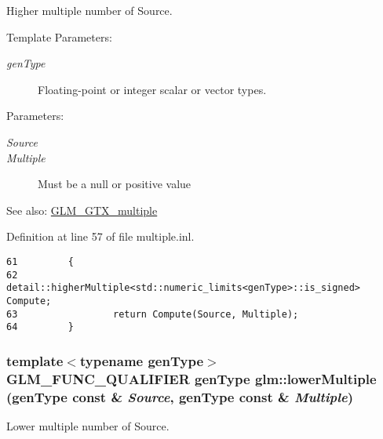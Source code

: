 Higher multiple number of Source.

\begin{Desc}
\item[Template Parameters:]
\begin{description}
\item[{\em genType}]Floating-point or integer scalar or vector types. \end{description}
\end{Desc}
\begin{Desc}
\item[Parameters:]
\begin{description}
\item[{\em Source}]\item[{\em Multiple}]Must be a null or positive value\end{description}
\end{Desc}
\begin{Desc}
\item[See also:]\hyperlink{group__gtx__multiple}{GLM\_\-GTX\_\-multiple} \end{Desc}


Definition at line 57 of file multiple.inl.

\begin{Code}\begin{verbatim}61         {
62                 detail::higherMultiple<std::numeric_limits<genType>::is_signed> Compute;
63                 return Compute(Source, Multiple);
64         }
\end{verbatim}
\end{Code}


\hypertarget{group__gtx__multiple_gecccd82257351764e3c2bec8973458e3}{
\subsubsection[lowerMultiple]{\setlength{\rightskip}{0pt plus 5cm}template$<$typename genType$>$ GLM\_\-FUNC\_\-QUALIFIER genType glm::lowerMultiple (genType const \& {\em Source}, \/  genType const \& {\em Multiple})}}
\label{group__gtx__multiple_gecccd82257351764e3c2bec8973458e3}


Lower multiple number of Source.


